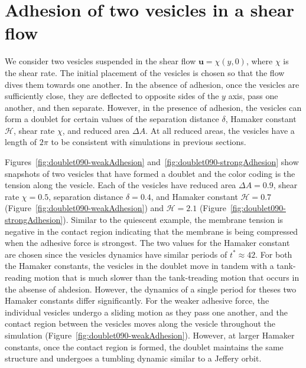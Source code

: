 \documentclass[prf,superscriptaddress,showkeys,longbibliography]{revtex4-1}
\newcommand{\uu}{\mathbf{u}}
\begin{document}
\section{Adhesion of two vesicles in a shear flow}
\label{sec:sflow} 
We consider two vesicles suspended in the shear flow $\uu = \chi(y,0)$,
where $\chi$ is the shear rate.  The initial placement of the vesicles
is chosen so that the flow dives them towards one another.  In the
absence of adhesion, once the vesicles are sufficiently close, they are
deflected to opposite sides of the $y$ axis, pass one another, and then
separate.  However, in the presence of adhesion, the vesicles can form a
doublet for certain values of the separation distance $\delta$, Hamaker
constant $\mathcal{H}$, shear rate $\chi$, and reduced area $\Delta A$.
At all reduced areas, the vesicles have a length of $2\pi$ to be
consistent with simulations in previous sections.  

Figures~\ref{fig:doublet090-weakAdhesion}
and~\ref{fig:doublet090-strongAdhesion} show snapshots of two vesicles
that have formed a doublet and the color coding is the tension along the
vesicle.  Each of the vesicles have reduced area $\Delta A = 0.9$, shear
rate $\chi = 0.5$, separation distance $\delta = 0.4$, and Hamaker
constant $\mathcal{H} = 0.7$ (Figure~\ref{fig:doublet090-weakAdhesion})
and $\mathcal{H} = 2.1$ (Figure~\ref{fig:doublet090-strongAdhesion}).
Similar to the quiescent example, the membrane tension is negative in
the contact region indicating that the membrane is being compressed when
the adhesive force is strongest.  The two values for the Hamaker
constant are chosen since the vesicles dynamics have similar periods of
$t^* \approx 42$.  For both the Hamaker constants, the vesicles in the
doublet move in tandem with a tank-reading motion that is much slower
than the tank-treading motion that occurs in the absense of ahdesion.
However, the dynamics of a single period for theses two Hamaker
constants differ significantly.  For the weaker adhesive force, the
individual vesicles undergo a sliding motion as they pass one another,
and the contact region between the vesicles moves along the vesicle
throughout the simulation (Figure~\ref{fig:doublet090-weakAdhesion}).
However, at larger Hamaker constants, once the contact region is formed,
the doublet maintains the same structure and undergoes a tumbling
dynamic similar to a Jeffery orbit.
\end{document}
